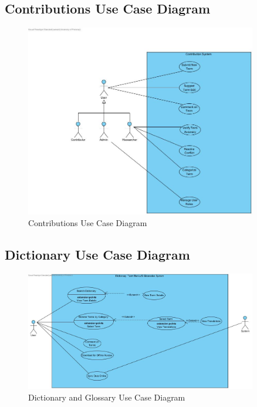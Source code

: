 \documentclass[12pt]{article}
\begin{document}
\subsection{Contributions Use Case Diagram}
\begin{figure}[H]
  \centering
  \includegraphics[width=0.9\textwidth]{Contributions.jpg}
  \caption{Contributions Use Case Diagram}
  \label{fig:contributions-use-case}
\end{figure}

\subsection{Dictionary Use Case Diagram}
\begin{figure}[H]
  \centering
  \includegraphics[width=0.9\textwidth]{Dictionary,Glossaies and Term Banl.jpg}
  \caption{Dictionary and Glossary Use Case Diagram}
  \label{fig:dictionary-use-case}
\end{figure}
\end{document}
